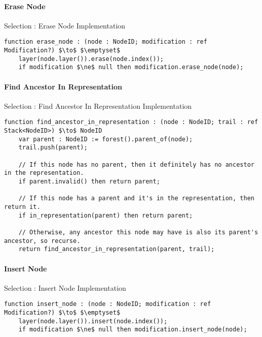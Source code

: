 \paragraph{Erase Node}

\begin{stulisting}[H]
\caption{Selection : Erase Node Implementation}
\begin{lstlisting}[style=Default]
function erase_node : (node : NodeID; modification : ref Modification?) $\to$ $\emptyset$
	layer(node.layer()).erase(node.index());
	if modification $\ne$ null then modification.erase_node(node);
\end{lstlisting}
\end{stulisting}

\paragraph{Find Ancestor In Representation}

\begin{stulisting}[H]
\caption{Selection : Find Ancestor In Representation Implementation}
\begin{lstlisting}[style=Default]
function find_ancestor_in_representation : (node : NodeID; trail : ref Stack<NodeID>) $\to$ NodeID
	var parent : NodeID := forest().parent_of(node);
	trail.push(parent);

	// If this node has no parent, then it definitely has no ancestor in the representation.
	if parent.invalid() then return parent;

	// If this node has a parent and it's in the representation, then return it.
	if in_representation(parent) then return parent;

	// Otherwise, any ancestor this node may have is also its parent's ancestor, so recurse.
	return find_ancestor_in_representation(parent, trail);
\end{lstlisting}
\end{stulisting}

\paragraph{Insert Node}

\begin{stulisting}[H]
\caption{Selection : Insert Node Implementation}
\begin{lstlisting}[style=Default]
function insert_node : (node : NodeID; modification : ref Modification?) $\to$ $\emptyset$
	layer(node.layer()).insert(node.index());
	if modification $\ne$ null then modification.insert_node(node);
\end{lstlisting}
\end{stulisting}

